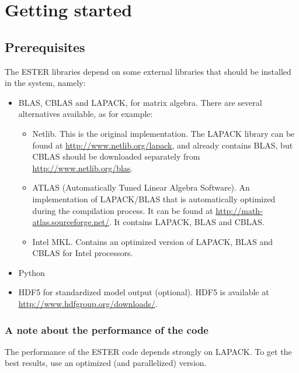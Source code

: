 \chapter{Getting started}
\section{Prerequisites}

The ESTER libraries depend on some external libraries that should be installed in
the system, namely:
\begin{itemize}
    \item BLAS, CBLAS and LAPACK, for matrix algebra. There are several
        alternatives available, as for example:
        \begin{itemize}
            \item Netlib. This is the original implementation. The LAPACK
                library can be found at \url{http://www.netlib.org/lapack}, and
                already contains BLAS, but CBLAS should be downloaded separately
                from \url{http://www.netlib.org/blas}.
            \item ATLAS (Automatically Tuned Linear Algebra Software). An
                implementation of LAPACK/BLAS that is automatically optimized
                during the compilation process. It can be found at
                \url{http://math-atlas.sourceforge.net/}. It contains LAPACK,
                BLAS and CBLAS.
            \item Intel MKL. Contains an optimized version of LAPACK, BLAS and
                CBLAS for Intel processors.
        \end{itemize}
    \item Python
    \item HDF5 for standardized model output (optional). HDF5 is available at
        \url{http://www.hdfgroup.org/downloads/}.
\end{itemize}

\subsection{A note about the performance of the code}
The performance of the ESTER code depends strongly on LAPACK. To get the best results,
use an optimized (and parallelized) version.

